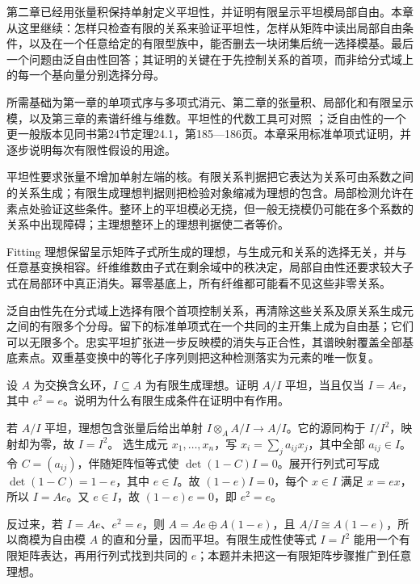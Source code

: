 \ProseParagraphBreak

第二章已经用张量积保持单射定义平坦性，并证明有限呈示平坦模局部自由。本章从这里继续：怎样只检查有限的关系来验证平坦性，怎样从矩阵中读出局部自由条件，以及在一个任意给定的有限型族中，能否删去一块闭集后统一选择模基。最后一个问题由泛自由性回答；其证明的关键在于先控制关系的首项，而非给分式域上的每一个基向量分别选择分母。

\ProseParagraphBreak

所需基础为第一章的单项式序与多项式消元、第二章的张量积、局部化和有限呈示模，以及第三章的素谱纤维与维数。平坦性的代数工具可对照 \cite[第7节，第45—53页]{Matsumura1989}；泛自由性的一个更一般版本见同书第24节定理24.1，第185—186页。本章采用标准单项式证明，并逐步说明每次有限性假设的用途。






\begin{chaptersummary}
	平坦性要求张量不增加单射左端的核。有限关系判据把它表达为关系可由系数之间的关系生成；有限生成理想判据则把检验对象缩减为理想的包含。局部检测允许在素点处验证这些条件。整环上的平坦模必无挠，但一般无挠模仍可能在多个系数的关系中出现障碍；主理想整环上的理想判据使二者等价。

	\ProseParagraphBreak

	Fitting 理想保留呈示矩阵子式所生成的理想，与生成元和关系的选择无关，并与任意基变换相容。纤维维数由子式在剩余域中的秩决定，局部自由性还要求较大子式在局部环中真正消失。幂零基底上，所有纤维都可能看不见这些非零关系。

	\ProseParagraphBreak

	泛自由性先在分式域上选择有限个首项控制关系，再清除这些关系及原关系生成元之间的有限多个分母。留下的标准单项式在一个共同的主开集上成为自由基；它们可以无限多个。忠实平坦扩张进一步反映模的消失与正合性，其谱映射覆盖全部基底素点。双重基变换中的等化子序列则把这种检测落实为元素的唯一恢复。
\end{chaptersummary}

\BookExercises

\begin{exercise}\label{g5:ex:flat-cyclic-idempotent}
	设 \(A\) 为交换含幺环，\(I\subseteq A\) 为有限生成理想。证明 \(A/I\) 平坦，当且仅当 \(I=Ae\)，其中 \(e^2=e\)。说明为什么有限生成条件在证明中有作用。
\end{exercise}
\begin{solution}
	若 \(A/I\) 平坦，理想包含张量后给出单射
	\(I\otimes_A A/I\to A/I\)。它的源同构于 \(I/I^2\)，映射却为零，故 \(I=I^2\)。
	选生成元 \(x_1,\ldots,x_n\)，写 \(x_i=\sum_j a_{ij}x_j\)，其中全部 \(a_{ij}\in I\)。令 \(C=(a_{ij})\)，伴随矩阵恒等式使 \(\det(1-C)I=0\)。展开行列式可写成 \(\det(1-C)=1-e\)，其中 \(e\in I\)。故 \((1-e)I=0\)，每个 \(x\in I\) 满足 \(x=ex\)，所以 \(I=Ae\)。又 \(e\in I\)，故 \((1-e)e=0\)，即 \(e^2=e\)。

	反过来，若 \(I=Ae\)、\(e^2=e\)，则 \(A=Ae\oplus A(1-e)\)，且 \(A/I\cong A(1-e)\)，所以商模为自由模 \(A\) 的直和分量，因而平坦。有限生成性使等式 \(I=I^2\) 能用一个有限矩阵表达，再用行列式找到共同的 \(e\)；本题并未把这一有限矩阵步骤推广到任意理想。
\end{solution}

